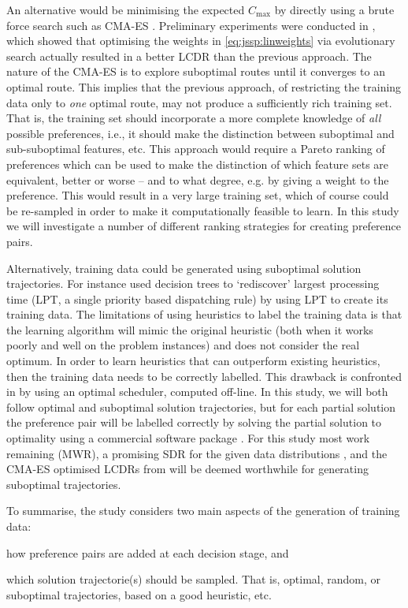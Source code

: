 \documentclass[smallextended]{llncs}
\newcommand{\shortcite}[1]{\cite{#1}}
\begin{document}
An alternative would be minimising the expected $C_{\max}$ by directly using a brute force search such as CMA-ES \cite{Hansen01}. Preliminary experiments were conducted in \shortcite{InRu14a}, which showed that optimising the weights in \cref{eq:jssp:linweights} via evolutionary search actually resulted in a better LCDR than the previous approach. The nature of the CMA-ES is to explore suboptimal routes until it converges to an optimal route. This implies that the previous approach, of restricting the training data only to \emph{one} optimal route, may not produce a sufficiently rich training set. That is, the training set should incorporate a more complete knowledge of \emph{all} possible preferences, i.e., it should make the distinction between suboptimal and sub-suboptimal features, etc.  This approach  would require a Pareto ranking of preferences which can be used to make the distinction of which feature sets are equivalent, better or worse -- and to what degree, e.g. by giving a weight to the preference. This would result in a very large training set, which of course could be re-sampled in order to make it computationally feasible to learn. In this study we will investigate a number of different ranking strategies for creating preference pairs.

Alternatively, training data could be generated using suboptimal solution trajectories. For instance \cite{Siggi05} used decision trees to `rediscover' largest processing time (LPT, a single priority based dispatching rule) by using LPT to create its training data. The limitations of using heuristics to label the training data is that the learning algorithm will mimic the original heuristic (both when it works poorly and well on the problem instances) and does not consider the real optimum. In order to learn heuristics that can outperform existing heuristics, then the training data needs to be correctly labelled. This drawback is confronted in \cite{Malik08,Russell09,Siggi10} by using an optimal scheduler, computed off-line. In this study, we will both follow optimal and suboptimal solution trajectories, but for each partial solution the preference pair will be labelled correctly by solving the partial solution to optimality using a commercial software package \cite{gurobi}. 
For this study most work remaining (MWR), a promising SDR for the given data distributions \cite{InRu12}, and the CMA-ES optimised LCDRs from \cite{InRu14a} will be deemed worthwhile for generating suboptimal trajectories.

To summarise, the study considers two main aspects of the generation of training data: 
\begin{inparaenum} 
\item how preference pairs are added at each decision stage, and
\item which solution trajectorie(s) should be sampled. That is, optimal, random, or suboptimal trajectories, based on a good heuristic, etc.
\end{inparaenum}
\end{document}
